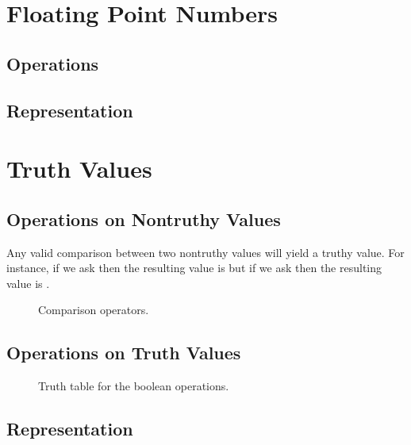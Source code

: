 \section{Floating Point Numbers}
\label{primitives:float}

\subsection{Operations}
\subsection{Representation}
\csharpsubsection{\csharp}

\section{Truth Values}


\subsection{Operations on Nontruthy Values}

Any valid comparison between two nontruthy values will yield a truthy value. For instance, if we ask  then the resulting value is  but if we ask  then the resulting value is .

\begin{figure}[tbp]
  
  \caption{Comparison operators.}
  \label{fig:prim:bool:comparison}
\end{figure}

\subsection{Operations on Truth Values}

\begin{figure}[tbp]
  
  \caption{Truth table for the boolean operations.}
  \label{fig:prim:bool:and}
\end{figure}


\subsection{Representation}


